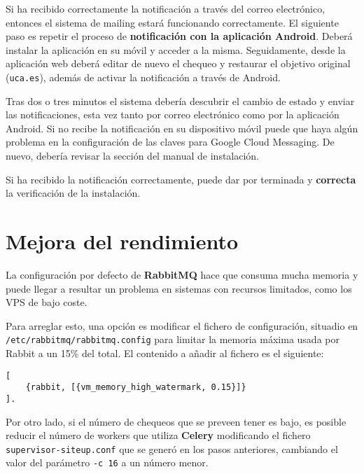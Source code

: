 Si ha recibido correctamente la notificación a través del correo electrónico,
entonces el sistema de mailing estará funcionando correctamente. El siguiente
paso es repetir el proceso de \textbf{notificación con la aplicación
  Android}. Deberá instalar la aplicación en su móvil y acceder a la
misma. Seguidamente, desde la aplicación web deberá editar de nuevo el chequeo y
restaurar el objetivo original (\texttt{uca.es}), además de activar la
notificación a través de Android.

Tras dos o tres minutos el sistema debería descubrir el cambio de estado y
enviar las notificaciones, esta vez tanto por correo electrónico como por la
aplicación Android. Si no recibe la notificación en su dispositivo móvil puede
que haya algún problema en la configuración de las claves para Google Cloud
Messaging. De nuevo, debería revisar la sección
\textit{} del manual de instalación.

Si ha recibido la notificación correctamente, puede dar por terminada y
\textbf{correcta} la verificación de la instalación.

\section{Mejora del rendimiento}

La configuración por defecto de \textbf{RabbitMQ} hace que consuma mucha memoria
y puede llegar a resultar un problema en sistemas con recursos limitados, como
los VPS de bajo coste.

Para arreglar esto, una opción es modificar el fichero de configuración,
situadio en \texttt{/etc/rabbitmq/rabbitmq.config} para limitar la memoria
máxima usada por Rabbit a un 15\% del total. El contenido a añadir al fichero es
el siguiente:

\begin{verbatim}
[
    {rabbit, [{vm_memory_high_watermark, 0.15}]}
].  
\end{verbatim}

Por otro lado, si el número de chequeos que se preveen tener es bajo, es posible
reducir el número de workers que utiliza \textbf{Celery} modificando el fichero
\texttt{supervisor-siteup.conf} que se generó en los pasos anteriores, cambiando
el valor del parámetro \texttt{-c 16} a un número menor.


